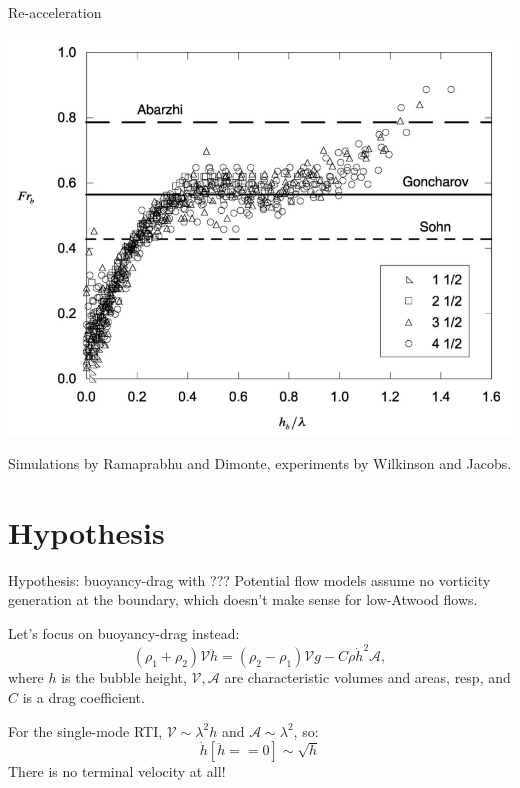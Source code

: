 \documentclass[12pt]{beamer}
\begin{document}
\begin{frame}[t]{Re-acceleration}
{\includegraphics[height=0.5\textheight]{graphics/wilkinson_Fr.png}

{\footnotesize Simulations by Ramaprabhu and Dimonte, experiments by Wilkinson and Jacobs.}
}
\end{frame}

\section{Hypothesis}

\begin{frame}{Hypothesis: buoyancy-drag with ???}
Potential flow models assume no vorticity generation at the boundary,
which doesn't make sense for low-Atwood flows.

\vspace{20pt} \pause
Let's focus on buoyancy-drag instead:
\begin{equation*}
(\rho_1 + \rho_2) \mathcal{V} \ddot{h} = (\rho_2 - \rho_1) \mathcal{V} g - C \rho \dot{h}^2 \mathcal{A},
\end{equation*}
where $h$ is the bubble height, $\mathcal{V}, \mathcal{A}$ are characteristic volumes and areas, resp, and $C$ is a drag coefficient.

\vspace{20pt} \pause
For the single-mode RTI, $\mathcal{V} \sim \lambda^2 h$ and $\mathcal{A} \sim \lambda^2$, so:
\begin{equation*}
\dot{h}\left[\ddot{h} == 0\right] \sim \sqrt{h}
\end{equation*}
There is no terminal velocity at all!

\end{frame}
\end{document}
